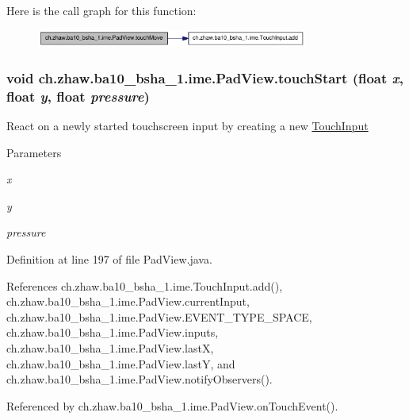 Here is the call graph for this function:\nopagebreak
\begin{figure}[H]
\begin{center}
\leavevmode
\includegraphics[width=253pt]{classch_1_1zhaw_1_1ba10__bsha__1_1_1ime_1_1PadView_a04937ec9e314a781c98cad2b080e63df_cgraph}
\end{center}
\end{figure}
\hypertarget{classch_1_1zhaw_1_1ba10__bsha__1_1_1ime_1_1PadView_aa6c73f1271801bab9f52b52e53ca9c06}{
\subsubsection[{touchStart}]{\setlength{\rightskip}{0pt plus 5cm}void ch.zhaw.ba10\_\-bsha\_\-1.ime.PadView.touchStart (float {\em x}, \/  float {\em y}, \/  float {\em pressure})}}
\label{classch_1_1zhaw_1_1ba10__bsha__1_1_1ime_1_1PadView_aa6c73f1271801bab9f52b52e53ca9c06}
React on a newly started touchscreen input by creating a new \hyperlink{classch_1_1zhaw_1_1ba10__bsha__1_1_1ime_1_1TouchInput}{TouchInput}


\begin{DoxyParams}{Parameters}
\item[{\em x}]\item[{\em y}]\item[{\em pressure}]\end{DoxyParams}


Definition at line 197 of file PadView.java.

References ch.zhaw.ba10\_\-bsha\_\-1.ime.TouchInput.add(), ch.zhaw.ba10\_\-bsha\_\-1.ime.PadView.currentInput, ch.zhaw.ba10\_\-bsha\_\-1.ime.PadView.EVENT\_\-TYPE\_\-SPACE, ch.zhaw.ba10\_\-bsha\_\-1.ime.PadView.inputs, ch.zhaw.ba10\_\-bsha\_\-1.ime.PadView.lastX, ch.zhaw.ba10\_\-bsha\_\-1.ime.PadView.lastY, and ch.zhaw.ba10\_\-bsha\_\-1.ime.PadView.notifyObservers().

Referenced by ch.zhaw.ba10\_\-bsha\_\-1.ime.PadView.onTouchEvent().

